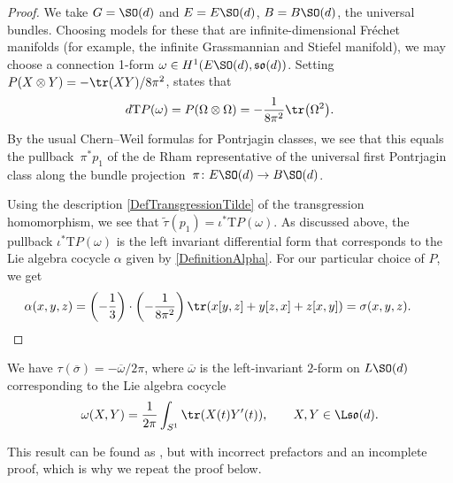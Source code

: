 \begin{proof}
We take $G = \SO(d)$ and $E = E\SO(d)$, $B = B\SO(d)$, the universal bundles.
Choosing models for these that are infinite-dimensional Fr\'echet manifolds (for example, the infinite Grassmannian and Stiefel manifold), we may choose a connection 1-form $\omega \in H^1(E\SO(d), \mathfrak{so}(d))$.
Setting $P(X \otimes Y) = -\tr(XY)/8\pi^2$, \cite[Proposition~3.2]{ChernSimons} states that
\begin{equation*}
 d \mathrm{T}P(\omega) = P(\Omega \otimes \Omega) = -\frac{1}{8\pi^2}\tr\big(\Omega^2\big).
\end{equation*}
By the usual Chern--Weil formulas for Pontrjagin classes, we see that this equals the pullback~$\pi^*p_1$ of the de Rham representative of the universal first Pontrjagin class along the bundle projection~$\pi\colon E\SO(d) \to B\SO(d)$.

Using the description \eqref{DefTransgressionTilde} of the transgression homomorphism, we see that $\tilde{\tau}(p_1) = \iota^*\mathrm{T}P(\omega)$.
As discussed above, the pullback $\iota^*\mathrm{T}P(\omega)$ is the left invariant differential form that corresponds to the Lie algebra cocycle $\alpha$ given by \eqref{DefinitionAlpha}.
For our particular choice of $P$, we get
\[
\alpha(x, y, z) = \left(-\frac{1}{3}\right) \cdot\left(-\frac{1}{8\pi^2}\right) \tr(x [y, z] + y [z, x] + z [x, y])
= \sigma(x, y, z).\tag*{\qed}
\]\renewcommand{\qed}{}
\end{proof}



\begin{Lemma}
\label{LemmaA3}
We have $\tau(\overline{\sigma}) = -\overline{\omega}/2 \pi$, where $\overline{\omega}$ is the left-invariant $2$-form on $L\SO(d)$ corresponding to the Lie algebra cocycle
\begin{equation*}
 \omega(X, Y) = \frac{1}{2\pi}\int_{S^1} \tr(X(t)Y^\prime(t)), \qquad X, Y \in \L\mathfrak{so}(d).	
\end{equation*}
\end{Lemma}

This result can be found as \cite[Proposition~4.4.4]{PressleySegal}, but with incorrect prefactors and an incomplete proof, which is why we repeat the proof below.

